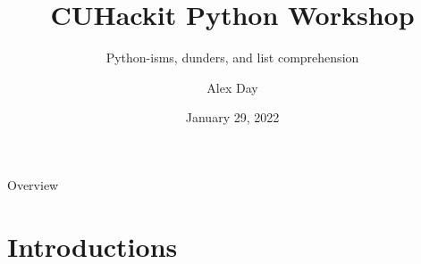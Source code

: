 \documentclass[aspectratio=169,xcolor=dvipsnames]{beamer}
\title[short title]{CUHackit Python Workshop} %
\subtitle{Python-isms, dunders, and list comprehension}
\author[Day]{Alex Day}
\institute[CU] %
{
  Ph.D. Student\\
  School of Computing\\
}
\date{January 29, 2022} %
\begin{document}
\begin{frame}
    \titlepage
\end{frame}

\begin{frame}{Overview}
    \tableofcontents
\end{frame}

\section{Introductions}
\end{document}
